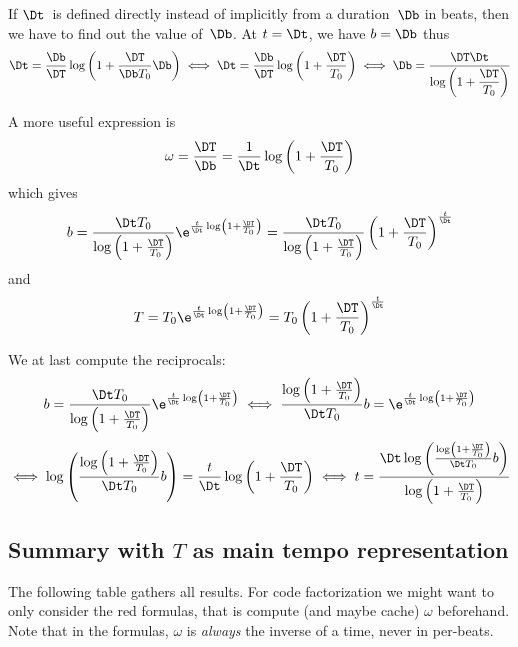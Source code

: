 \documentclass[10pt]{article}
\begin{document}
If $\Dt$~is defined directly instead of implicitly from a duration~$\Db$ in
beats, then we have to find out the value of~$\Db$. At $t=\Dt$, we have
$b = \Db$ thus
\[
    \Dt = \frac{\Db}{\DT} \log \left( 1 + \dfrac{\DT}{\Db T_0} \Db \right)
    \iff
    \Dt = \frac{\Db}{\DT} \log \left( 1 + \dfrac{\DT}{T_0} \right)
    \iff
    \Db = \frac{\DT\Dt}{\log \left( 1 + \dfrac{\DT}{T_0} \right) }
\]

A more useful expression is
\[
    \omega = \frac{\DT}{\Db}
    = \frac{1}{\Dt}\log\left(1+ \frac{\DT}{T_0}\right)
\]
which gives
\[
    b = \frac{\Dt T_0}{\log\left(1+ \frac{\DT}{T_0}\right)}
    \e^{\frac{t}{\Dt}\log\left(1+ \frac{\DT}{T_0}\right)}
    = \frac{\Dt T_0}{\log\left(1+ \frac{\DT}{T_0}\right)}
    \left(1+ \frac{\DT}{T_0}\right)^{\frac{t}{\Dt}}
\]
and
\[
    T
    = T_0 \e^{\frac{t}{\Dt}\log\left(1+ \frac{\DT}{T_0}\right)}
    = T_0 \left(1+ \frac{\DT}{T_0}\right)^{\frac{t}{\Dt}}
\]

We at last compute the reciprocals:
\[
    b = \frac{\Dt T_0}{\log\left(1+ \frac{\DT}{T_0}\right)}
        \e^{\frac{t}{\Dt}\log\left(1+ \frac{\DT}{T_0}\right)}
    \iff
    \frac{\log\left(1+ \frac{\DT}{T_0}\right)}{\Dt T_0} b
    = \e^{\frac{t}{\Dt}\log\left(1+ \frac{\DT}{T_0}\right)}
\]
\[
    \iff
    \log\left( \frac{\log\left(1+ \frac{\DT}{T_0}\right)}{\Dt T_0} b \right)
    = \frac{t}{\Dt}\log\left(1+ \frac{\DT}{T_0}\right)
    \iff
    t = \frac{
    \Dt
    \log\left( \frac{\log\left(1+ \frac{\DT}{T_0}\right)}{\Dt T_0} b \right)
    }{
    \log\left(1+ \frac{\DT}{T_0}\right)
    }
\]

\subsection{Summary with $T$ as main tempo representation}

The following table gathers all results. For code factorization we might want
to only consider the red formulas, that is compute (and maybe cache) $\omega$
beforehand. Note that in the formulas, $\omega$ is \emph{always} the inverse of
a time, never in per-beats.
\end{document}
